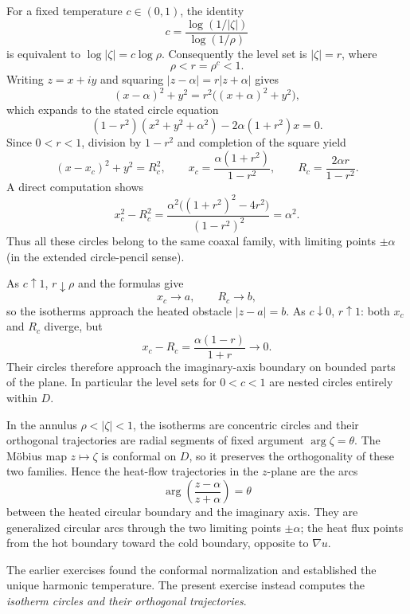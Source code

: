 \begin{solution}
For a fixed temperature $c\in(0,1)$, the identity
\[
c=\frac{\log(1/|\zeta|)}{\log(1/\rho)}
\]
is equivalent to $\log|\zeta|=c\log\rho$. Consequently the level set
is $|\zeta|=r$, where
\[
\rho<r=\rho^c<1.
\]
Writing $z=x+iy$ and squaring $|z-\alpha|=r|z+\alpha|$ gives
\[
(x-\alpha)^2+y^2=r^2\bigl((x+\alpha)^2+y^2\bigr),
\]
which expands to the stated circle equation
\[
(1-r^2)(x^2+y^2+\alpha^2)-2\alpha(1+r^2)x=0.
\]
Since $0<r<1$, division by $1-r^2$ and completion of the square yield
\[
\boxed{\quad
(x-x_c)^2+y^2=R_c^2,\qquad
x_c=\frac{\alpha(1+r^2)}{1-r^2},\qquad
R_c=\frac{2\alpha r}{1-r^2}.
\quad}
\]
A direct computation shows
\[
x_c^2-R_c^2
=\frac{\alpha^2\bigl((1+r^2)^2-4r^2\bigr)}{(1-r^2)^2}
=\alpha^2.
\]
Thus all these circles belong to the same coaxal family, with limiting
points $\pm\alpha$ (in the extended circle-pencil sense).

As $c\uparrow1$, $r\downarrow\rho$ and the formulas give
\[
x_c\longrightarrow a,\qquad R_c\longrightarrow b,
\]
so the isotherms approach the heated obstacle $|z-a|=b$.
As $c\downarrow0$, $r\uparrow1$: both $x_c$ and $R_c$ diverge, but
\[
x_c-R_c=\frac{\alpha(1-r)}{1+r}\longrightarrow0.
\]
Their circles therefore approach the imaginary-axis boundary on bounded
parts of the plane. In particular the level sets for $0<c<1$ are
nested circles entirely within $D$.

In the annulus $\rho<|\zeta|<1$, the isotherms are concentric
circles and their orthogonal trajectories are radial segments of fixed
argument $\arg\zeta=\theta$. The M\"obius map $z\mapsto\zeta$ is
conformal on $D$, so it preserves the orthogonality of these two
families. Hence the heat-flow trajectories in the $z$-plane are the
arcs
\[
\boxed{\quad
\arg\!\left(\frac{z-\alpha}{z+\alpha}\right)=\theta
\quad}
\]
between the heated circular boundary and the imaginary axis. They
are generalized circular arcs through the two limiting points
$\pm\alpha$; the heat flux points from the hot boundary toward the
cold boundary, opposite to $\nabla u$.

The earlier exercises found the conformal normalization and established
the unique harmonic temperature. The present exercise instead
computes the \emph{isotherm circles and their orthogonal trajectories}.

\end{solution}



